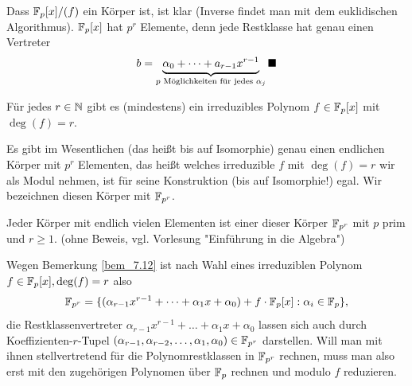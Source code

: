 	Dass $\mathbb{F}_p[x]/(f)$ ein Körper ist, ist klar (Inverse findet man mit dem euklidischen Algorithmus). 
	$\mathbb{F}_p[x]$ hat $p^r$ Elemente, denn jede Restklasse hat genau einen Vertreter
	\[ b = \underbrace{\alpha_0 + \dots + a_{r-1} x^{r-1}}_{p \text{ Möglichkeiten für jedes } \alpha_j} \qed\]
	
\begin{bem}
	Für jedes $r \in \mathbb{N}$ gibt es (mindestens) ein irreduzibles Polynom $f \in \mathbb{F}_p[x]$ mit $\deg(f) = r$.
\end{bem}

\begin{bem}
	Es gibt im Wesentlichen (das heißt bis auf Isomorphie) genau einen endlichen Körper mit $p^r$ Elementen, das heißt welches irreduzible $f$ mit $\deg(f) = r$ wir als Modul nehmen, ist für seine Konstruktion (bis auf Isomorphie!) egal. 
	Wir bezeichnen diesen Körper mit $\mathbb{F}_{p^r}$.
\end{bem}

\begin{bem}
	Jeder Körper mit endlich vielen Elementen ist einer dieser Körper $\mathbb{F}_{p^r}$ mit $p$ prim und $r \geq 1$. 
	(ohne Beweis, vgl. Vorlesung "Einführung in die Algebra")
\end{bem}

\begin{bem}
	Wegen Bemerkung \ref{bem_7.12} ist nach Wahl eines irreduziblen Polynom $f \in \mathbb{F}_p[x], \deg(f) = r$ also
	\[\mathbb{F}_{p^r} = \{ (\alpha_{r-1} x^{r-1} + \dots + \alpha_1 x + \alpha_0) + f \cdot \mathbb{F}_p[x] : \alpha_i \in \mathbb{F}_p\},\]
	die Restklassenvertreter $\alpha_{r-1} x^{r-1} + \dots + \alpha_1 x + \alpha_0$ lassen sich auch durch Koeffizienten-$r$-Tupel $(\alpha_{r-1}, \alpha_{r-2}, \dots, \alpha_1, \alpha_0) \in \mathbb{F}_{p^r}$ darstellen. 
	Will man mit ihnen stellvertretend für die Polynomrestklassen in $\mathbb{F}_{p^r}$ rechnen, muss man also erst mit den zugehörigen Polynomen über $\mathbb{F}_p$ rechnen und modulo $f$ reduzieren.
\end{bem}

